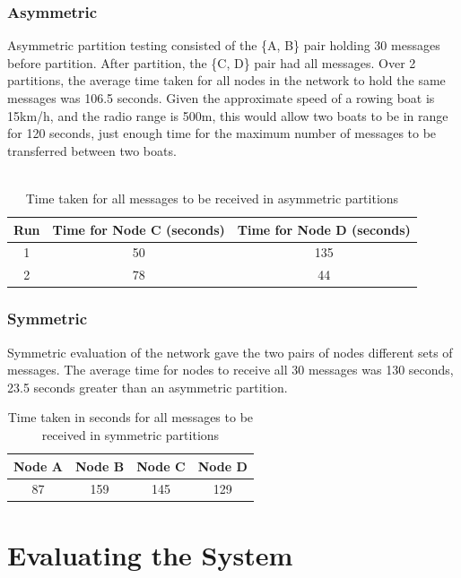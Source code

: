 \documentclass[12pt,a4paper]{report}
\begin{document}
\subsubsection{Asymmetric}
Asymmetric partition testing consisted of the \{A, B\} pair holding 30 messages before partition. After partition, the \{C, D\} pair had all messages. Over 2 partitions, the average time taken for all nodes in the network to hold the same messages was 106.5 seconds. Given the approximate speed of a rowing boat is 15km/h, and the radio range is 500m, this would allow two boats to be in range for 120 seconds, just enough time for the maximum number of messages to be transferred between two boats.  \\ \\
\begin{table}
\begin{center}
\begin{tabular}{ |c|c|c| } 
\hline
Run & Time for Node C (seconds) & Time for Node D (seconds) \\ 
\hline
1 & 50 & 135 \\ 
\hline
2 & 78 & 44  \\ 
\hline
\end{tabular}
\end{center}
\caption{Time taken for all messages to be received in asymmetric partitions}
\end{table}  

\subsubsection{Symmetric}
Symmetric evaluation of the network gave the two pairs of nodes different sets of messages.
The average time for nodes to receive all 30 messages was 130 seconds, 23.5 seconds greater than an asymmetric partition.
\begin{table}
\begin{center}
\begin{tabular}{ |c|c|c|c| } 
\hline
Node A & Node B & Node C & Node D \\ 
\hline
87 & 159 & 145 & 129 \\ 
\hline
\end{tabular}
\end{center}
\caption{Time taken in seconds for all messages to be received in symmetric partitions}
\end{table}  %

\section{Evaluating the System}
\end{document}

